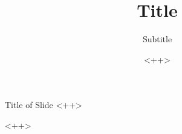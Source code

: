 \documentclass{beamer}
\title[Short Title]{Title}
\subtitle{Subtitle}
\author{<++>}
\begin{document}
\begin{frame}
\titlepage
\end{frame}

\begin{frame}[t]{Title of Slide} \vspace{4pt}
<++> \pause
\end{frame}
<++>
\end{document}
